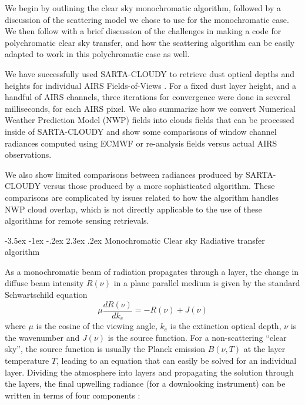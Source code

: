 \documentclass[11pt]{article}
\makeatletter
\newcommand{\sasc}{\textsf{SARTA-CLOUDY}\xspace}
\newcommand{\ecmwf}{\textsf{ECMWF}\xspace}
\renewcommand{\section}{\@startsection {section}{1}{\z@}%
                                   {-3.5ex \@plus -1ex \@minus -.2ex}%
                                   {2.3ex \@plus.2ex}%
                                   {\reset@font\large\bfseries}}
\makeatother
\begin{document}
    We begin by outlining the clear sky monochromatic algorithm,
    followed by a discussion of the scattering model we chose to use
    for the monochromatic case. We then follow with a brief discussion
    of the challenges in making a code for polychromatic clear sky
    transfer, and how the scattering algorithm can be easily adapted
    to work in this polychromatic case as well.

    We have successfully used \sasc to retrieve dust optical
    depths and heights for individual AIRS Fields-of-Views
    \cite{mac:10}.  For a fixed dust layer height, and a handful of
    AIRS channels, three iterations for convergence were done in
    several milliseconds, for each AIRS pixel. We also summarize how
    we convert Numerical Weather Prediction Model (NWP) fields into
    clouds fields that can be processed inside of \sasc and show some
    comparisons of window channel radiances computed using \ecmwf or re-analysis
    fields versus actual AIRS observations.

    We also show limited comparisons between radiances produced by
    \sasc versus those produced by a more sophisticated algorithm.
    These comparisons are complicated by issues related to how the
    algorithm handles NWP cloud overlap, which is not directly
    applicable to the use of these algorithms for remote sensing
    retrievals.

    \section{Monochromatic Clear sky Radiative transfer algorithm}

    As a monochromatic beam of radiation propagates through a layer,
    the change in diffuse beam intensity $R(\nu)$ in a plane parallel
    medium is given by the standard Schwartschild equation
    \cite{lio:80,goo:89,edw:92}
    \begin{equation}
      \mu \frac{dR(\nu)}{dk_{e}} = -R(\nu) + J(\nu)
      \label{eqn:sch}
    \end{equation}
    where $\mu$ is the cosine of the viewing angle, $k_{e}$ is the
    extinction optical depth, $\nu$ is the wavenumber and $J(\nu)$ is
    the source function. For a non-scattering ``clear sky'', the source
    function is usually the Planck emission $B(\nu,T)$ at the layer
    temperature $T$, leading to an equation that can easily be solved
    for an individual layer. Dividing the atmosphere into layers and
    propagating the solution through the layers, the final upwelling
    radiance (for a downlooking instrument) can be written in terms of
    four components :
\end{document}
